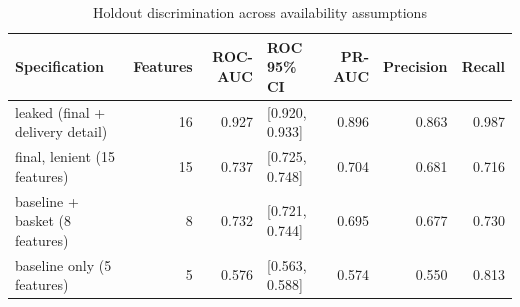 \begin{table}
\caption{Holdout discrimination across availability assumptions}
\begin{tabular}{lrrlrrr}
\toprule
Specification & Features & ROC-AUC & ROC 95\% CI & PR-AUC & Precision & Recall \\
\midrule
leaked (final + delivery detail) & 16 & 0.927 & [0.920, 0.933] & 0.896 & 0.863 & 0.987 \\
final, lenient (15 features) & 15 & 0.737 & [0.725, 0.748] & 0.704 & 0.681 & 0.716 \\
baseline + basket (8 features) & 8 & 0.732 & [0.721, 0.744] & 0.695 & 0.677 & 0.730 \\
baseline only (5 features) & 5 & 0.576 & [0.563, 0.588] & 0.574 & 0.550 & 0.813 \\
\bottomrule
\end{tabular}
\end{table}
